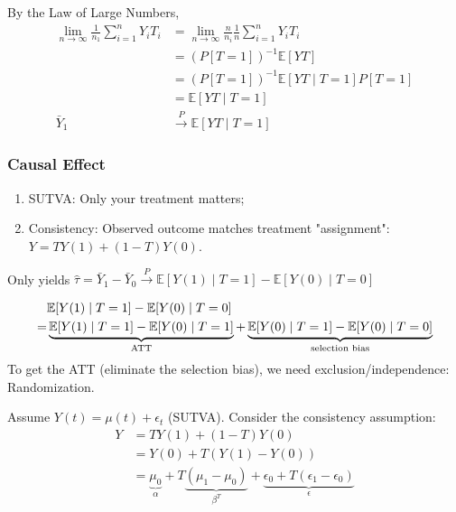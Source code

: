 \documentclass[11pt]{elegantbook}
\begin{document}
By the Law of Large Numbers,
\begin{equation}
    \begin{aligned}
        \lim_{n \rightarrow \infty}\frac{1}{n_1}\sum_{i=1}^n Y_i T_i&=\lim_{n \rightarrow \infty}\frac{n}{n_i}\frac{1}{n}\sum_{i=1}^n Y_i T_i\\
        &=\left(P[T=1]\right)^{-1} \mathbb{E}[YT]\\
        &= \left(P[T=1]\right)^{-1}\mathbb{E}[YT\mid T=1]P[T=1]\\
        &=\mathbb{E}[YT\mid T=1]\\
        \bar{Y}_1 &\stackrel{P}{\longrightarrow} \mathbb{E}[YT\mid T=1]
    \end{aligned}
    \nonumber
\end{equation}

\subsubsection*{Causal Effect}
\begin{assumption}\quad
    \begin{enumerate}[(1).]
        \item SUTVA: Only your treatment matters;
        \item Consistency: Observed outcome matches treatment "assignment": $Y=TY(1)+(1-T)Y(0)$.
    \end{enumerate}
\end{assumption}

Only yields $\hat{\tau}=\bar{Y}_1-\bar{Y}_0\stackrel{P}{\longrightarrow} \mathbb{E}[Y(1)\mid T=1]-\mathbb{E}[Y(0)\mid T=0]$

\begin{equation}
    \begin{aligned}
        &\mathbb{E}[Y(1)\mid T=1]-\mathbb{E}[Y(0)\mid T=0]\\
        =&\underbrace{\mathbb{E}[Y(1)\mid T=1]-\mathbb{E}[Y(0)\mid T=1]}_{\textnormal{ATT}}+\underbrace{\mathbb{E}[Y(0)\mid T=1]-\mathbb{E}[Y(0)\mid T=0]}_{\textnormal{selection bias}}\\
    \end{aligned}
    \nonumber
\end{equation}
To get the ATT (eliminate the selection bias), we need exclusion/independence: Randomization.


Assume $Y(t)=\mu(t)+\epsilon_t$ (SUTVA). Consider the consistency assumption:
\begin{equation}
    \begin{aligned}
        Y&=TY(1)+(1-T)Y(0)\\
        &=Y(0)+T(Y(1)-Y(0))\\
        &=\underbrace{\mu_0}_\alpha+T\underbrace{(\mu_1-\mu_0)}_{\beta^T}+\underbrace{\epsilon_0+T(\epsilon_1-\epsilon_0)}_{\epsilon}
    \end{aligned}
    \nonumber
\end{equation}
\end{document}
